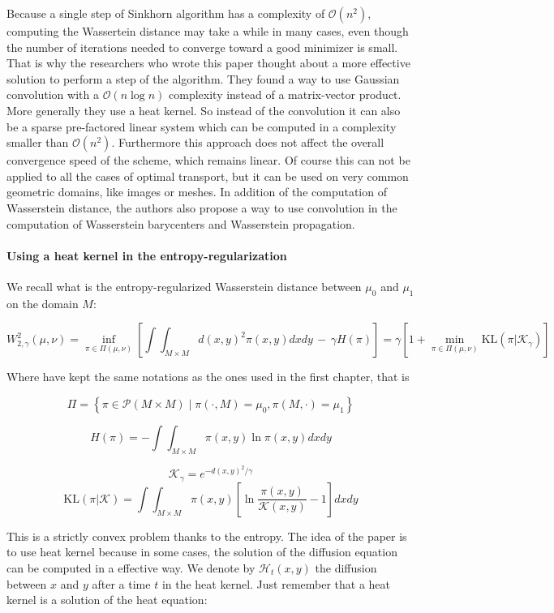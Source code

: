 Because a single step of Sinkhorn algorithm has a complexity of
$\mathcal{O}(n^2)$, computing the Wassertein distance may take a while in
many cases, even though the number of iterations needed to converge toward
a good minimizer is small. That is why the researchers who wrote this paper
thought about a more effective solution to perform a step of the
algorithm. They found a way to use Gaussian convolution with a $\mathcal{O}(n
\log n)$ complexity instead of a matrix-vector product. More generally they
use a heat kernel. So instead of the convolution it can also be a sparse
pre-factored linear system which can be computed in a complexity smaller
than $\mathcal{O}(n^2)$. Furthermore this approach does not affect the overall
convergence speed of the scheme, which remains linear. Of course this can
not be applied to all the cases of optimal transport, but it can be used
on very common geometric domains, like images or meshes. In addition of the
computation of Wasserstein distance, the authors also propose a way to use
convolution in the computation of Wasserstein barycenters and Wasserstein
propagation.

\paragraph{Using a heat kernel in the entropy-regularization}
We recall what is the entropy-regularized Wasserstein distance between $\mu_0$
and $\mu_1$ on the domain $M$:

$$
    W_{2, \gamma}^2(\mu, \nu)
        = \inf_{\pi \in \Pi(\mu, \nu)} \left[ \int \int_{M\times M} d(x, y)^2 \pi(x, y) dx dy \, - \, \gamma H(\pi) \right]
        = \gamma \left[ 1 + \min_{\pi \in \Pi(\mu,\nu)} \text{KL}(\pi | \mathcal{K}_\gamma) \right]
$$

Where have kept the same notations as the ones used in the first chapter,
that is

$$
    \Pi = \left\{ \pi \in \mathcal{P}(M \times M) \mid \pi(\cdot, M) = \mu_0, \pi(M, \cdot) = \mu_1 \right\}
$$

$$
    H(\pi) = - \int \int_{M \times M} \pi(x, y) \ln \pi(x, y) dx dy
$$

$$
    \mathcal{K}_\gamma = e^{-d(x, y)^2 / \gamma}
$$
$$
    \text{KL}(\pi | \mathcal{K}) = \int \int_{M \times M} \pi(x, y) \left[ \ln \dfrac{\pi(x, y)}{\mathcal{K}(x, y)} - 1 \right] dx dy
$$

This is a strictly convex problem thanks to the entropy. The idea of the paper
is to use heat kernel because in some cases, the solution of the diffusion
equation can be computed in a effective way. We denote by $\mathcal{H}_t(x,
y)$ the diffusion between $x$ and $y$ after a time $t$ in the heat kernel. Just
remember that a heat kernel is a solution of the heat equation:

